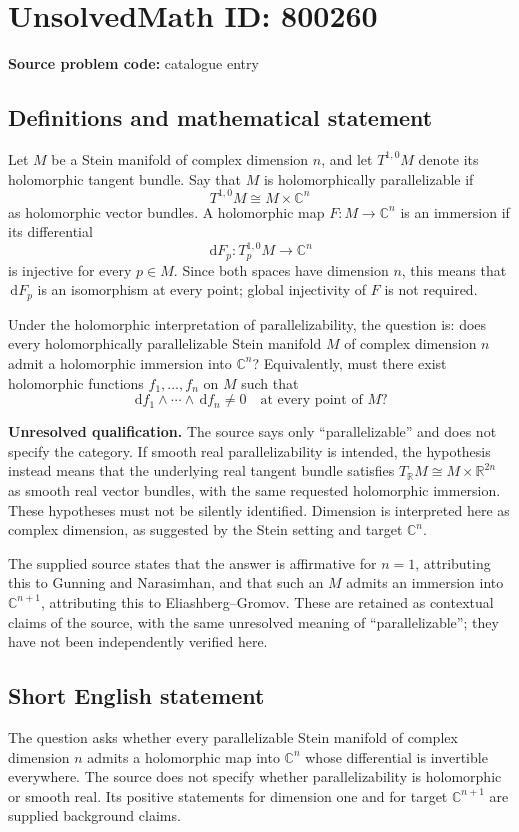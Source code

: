 \documentclass[11pt]{article}
\newcommand{\R}{\mathbb{R}}
\newcommand{\C}{\mathbb{C}}
\newcommand{\dd}{\,\mathrm{d}}
\begin{document}
\section*{UnsolvedMath ID: 800260}
\textbf{Source problem code:} catalogue entry
\subsection{Definitions and mathematical statement}
Let \(M\) be a Stein manifold of complex dimension \(n\), and let \(T^{1,0}M\) denote its holomorphic tangent bundle. Say that \(M\) is holomorphically parallelizable if
\[
T^{1,0}M\cong M\times\C^n
\]
as holomorphic vector bundles. A holomorphic map \(F:M\to\C^n\) is an immersion if its differential
\[
\dd F_p:T^{1,0}_pM\longrightarrow\C^n
\]
is injective for every \(p\in M\). Since both spaces have dimension \(n\), this means that \(\dd F_p\) is an isomorphism at every point; global injectivity of \(F\) is not required.

Under the holomorphic interpretation of parallelizability, the question is: does every holomorphically parallelizable Stein manifold \(M\) of complex dimension \(n\) admit a holomorphic immersion into \(\C^n\)? Equivalently, must there exist holomorphic functions \(f_1,\ldots,f_n\) on \(M\) such that
\[
\dd f_1\wedge\cdots\wedge\dd f_n\ne0
\quad\text{at every point of }M?
\]

\textbf{Unresolved qualification.} The source says only ``parallelizable'' and does not specify the category. If smooth real parallelizability is intended, the hypothesis instead means that the underlying real tangent bundle satisfies \(T_{\R}M\cong M\times\R^{2n}\) as smooth real vector bundles, with the same requested holomorphic immersion. These hypotheses must not be silently identified. Dimension is interpreted here as complex dimension, as suggested by the Stein setting and target \(\C^n\).

The supplied source states that the answer is affirmative for \(n=1\), attributing this to Gunning and Narasimhan, and that such an \(M\) admits an immersion into \(\C^{n+1}\), attributing this to Eliashberg--Gromov. These are retained as contextual claims of the source, with the same unresolved meaning of ``parallelizable''; they have not been independently verified here.
\subsection{Short English statement}
The question asks whether every parallelizable Stein manifold of complex dimension \(n\) admits a holomorphic map into \(\C^n\) whose differential is invertible everywhere. The source does not specify whether parallelizability is holomorphic or smooth real. Its positive statements for dimension one and for target \(\C^{n+1}\) are supplied background claims.
\end{document}
